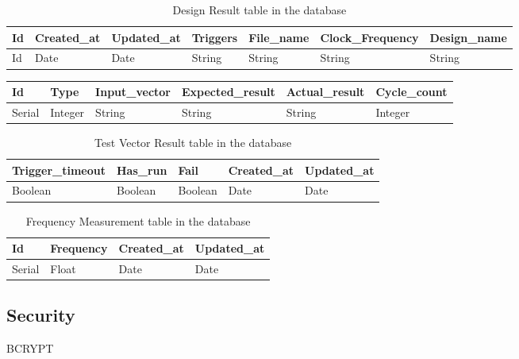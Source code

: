\begin{table}
\centering
    \begin{tabular}{ | l | l | l | l | l | l | l |}
    \hline
    Id & Created\_at & Updated\_at & Triggers & File\_name & Clock\_Frequency & Design\_name  \\ \hline
    Id & Date & Date & String & String & String & String \\ \hline
    \end{tabular}
    \caption{Design Result table in the database}
    \label{tab:design_result_table}
\end{table}
\begin{center}

    \begin{tabular}{ | l | l | l | l | l | l | }
    \hline
    Id & Type & Input\_vector & Expected\_result & Actual\_result & Cycle\_count\\ \hline
    Serial & Integer & String & String & String & Integer \\ \hline
    \end{tabular}
\end{center}

\begin{table}
\centering
    \begin{tabular}{ | l | l | l | l | l |}
	\hline
       Trigger\_timeout & Has\_run & Fail & Created\_at & Updated\_at\\ \hline
       Boolean & Boolean & Boolean & Date & Date\\ \hline
    \end{tabular}
    \caption{Test Vector Result table in the database}
    \label{tab:Test_vector_result_table}
\end{table}

\begin{table}
\centering
    \begin{tabular}{| l | l | l | l |}
	\hline
       Id & Frequency & Created\_at & Updated\_at\\ \hline
       Serial & Float & Date & Date\\ \hline
    \end{tabular}
    \caption{Frequency Measurement table in the database}
    \label{tab:Frequency_measurement_table}
\end{table}

\subsection{Security}
BCRYPT
